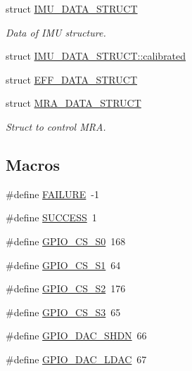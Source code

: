 \begin{DoxyCompactItemize}
struct \hyperlink{structIMU__DATA__STRUCT}{I\-M\-U\-\_\-\-D\-A\-T\-A\-\_\-\-S\-T\-R\-U\-C\-T}
\begin{DoxyCompactList}\small\item\em Data of I\-M\-U structure. \end{DoxyCompactList}\item 
struct \hyperlink{structIMU__DATA__STRUCT_1_1calibrated}{I\-M\-U\-\_\-\-D\-A\-T\-A\-\_\-\-S\-T\-R\-U\-C\-T\-::calibrated}
\item 
struct \hyperlink{structEFF__DATA__STRUCT}{E\-F\-F\-\_\-\-D\-A\-T\-A\-\_\-\-S\-T\-R\-U\-C\-T}
\item 
struct \hyperlink{structMRA__DATA__STRUCT}{M\-R\-A\-\_\-\-D\-A\-T\-A\-\_\-\-S\-T\-R\-U\-C\-T}
\begin{DoxyCompactList}\small\item\em Struct to control M\-R\-A. \end{DoxyCompactList}\end{DoxyCompactItemize}
\subsection*{Macros}
\begin{DoxyCompactItemize}
\item 
\#define \hyperlink{communication_01_07C_xC3_xB3pia_01em_01conflito_01de_01Caio_01Gustavo_01Mesquita_01Angelo_012013-05-17_08_8h_a6d58f9ac447476b4e084d7ca383f5183}{F\-A\-I\-L\-U\-R\-E}~-\/1
\item 
\#define \hyperlink{communication_01_07C_xC3_xB3pia_01em_01conflito_01de_01Caio_01Gustavo_01Mesquita_01Angelo_012013-05-17_08_8h_aa90cac659d18e8ef6294c7ae337f6b58}{S\-U\-C\-C\-E\-S\-S}~1
\item 
\#define \hyperlink{communication_01_07C_xC3_xB3pia_01em_01conflito_01de_01Caio_01Gustavo_01Mesquita_01Angelo_012013-05-17_08_8h_a48ea000c2b251ce26ea35d300f319651}{G\-P\-I\-O\-\_\-\-C\-S\-\_\-\-S0}~168
\item 
\#define \hyperlink{communication_01_07C_xC3_xB3pia_01em_01conflito_01de_01Caio_01Gustavo_01Mesquita_01Angelo_012013-05-17_08_8h_a7672ba13ff6f297c347790586c9a02e0}{G\-P\-I\-O\-\_\-\-C\-S\-\_\-\-S1}~64
\item 
\#define \hyperlink{communication_01_07C_xC3_xB3pia_01em_01conflito_01de_01Caio_01Gustavo_01Mesquita_01Angelo_012013-05-17_08_8h_a94b6d57532d1db55dc4efd9fb234f156}{G\-P\-I\-O\-\_\-\-C\-S\-\_\-\-S2}~176
\item 
\#define \hyperlink{communication_01_07C_xC3_xB3pia_01em_01conflito_01de_01Caio_01Gustavo_01Mesquita_01Angelo_012013-05-17_08_8h_ad774f00fc71216488e24a803bf4eb6aa}{G\-P\-I\-O\-\_\-\-C\-S\-\_\-\-S3}~65
\item 
\#define \hyperlink{communication_01_07C_xC3_xB3pia_01em_01conflito_01de_01Caio_01Gustavo_01Mesquita_01Angelo_012013-05-17_08_8h_a99fc26a9596a1cb1f0f9936dbb8ccca6}{G\-P\-I\-O\-\_\-\-D\-A\-C\-\_\-\-S\-H\-D\-N}~66
\item 
\#define \hyperlink{communication_01_07C_xC3_xB3pia_01em_01conflito_01de_01Caio_01Gustavo_01Mesquita_01Angelo_012013-05-17_08_8h_a014b45373b6ab21c681fc378bd8203f9}{G\-P\-I\-O\-\_\-\-D\-A\-C\-\_\-\-L\-D\-A\-C}~67
\end{DoxyCompactItemize}
